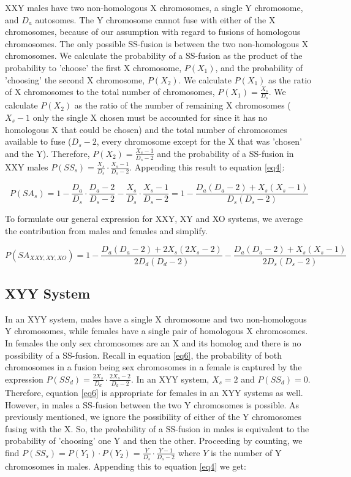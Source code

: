 \documentclass[12pt]{article}
\begin{document}
XXY males have two non-homologous X chromosomes, a single Y chromosome, and $D_a$ autosomes.
The Y chromosome cannot fuse with either of the X chromosomes, because of our assumption with regard to fusions of homologous chromosomes. 
The only possible SS-fusion is between the two non-homologous X chromosomes. 
We calculate the probability of a SS-fusion as the product of the probability to 'choose' the first X chromosome, $P(X_1)$, and the probability of 'choosing' the second X chromosome, $P(X_2)$. 
We calculate $P(X_1)$ as the ratio of X chromosomes to the total number of chromosomes, $P(X_1) = \frac{X_s}{D_s}$.
We calculate $P(X_2)$ as the ratio of the number of remaining X chromosomes ($X_s - 1$ only the single X chosen must be accounted for since it has no homologous X that could be chosen) and the total number of chromosomes available to fuse ($D_s - 2 $, every chromosome except for the X that was 'chosen' and the Y).  
Therefore, $P(X_2) = \frac{X_s - 1}{D_s - 2}$ and the probability of a SS-fusion in XXY males $P(SS_s) = \frac{X_s}{D_s} \cdot \frac{X_s - 1}{D_s - 2}$.
Appending this result to equation \ref{eq4}:

    \begin{equation} \label{eq7}
        P(SA_s) = 1 - \frac{D_a}{D_s} \cdot \frac{D_a - 2}{D_s - 2} - \frac{X_s}{D_s} \cdot \frac{X_s - 1}{D_s - 2} = 1 - \frac{D_a(D_a - 2) + X_s(X_s-1)}{D_s(D_s-2)}
    \end{equation}
    
To formulate our general expression for XXY, XY and XO systems, we average the contribution from males and females and simplify.

\begin{equation} \label{eq8}
P(SA_{XXY, XY, XO}) = 1 -\frac{D_a(D_a-2) + 2X_s(2X_s-2)}{2D_d(D_d-2)} - \frac{D_a(D_a - 2) + X_s(X_s-1)}{2D_s(D_s-2)}
\end{equation}

\subsection{XYY System}
In an XYY system, males have a single X chromosome and two non-homologous Y chromosomes, while females have a single pair of homologous X chromosomes.
In females the only sex chromosomes are an X and its homolog and there is no possibility of a SS-fusion.
Recall in equation \ref{eq6}, the probability of both chromosomes in a fusion being sex chromosomes in a female is captured by the expression $P(SS_d) = \frac{2X_s}{D_d} \cdot \frac{2X_s-2}{D_d-2}$. In an XYY system, $X_s=2$ and $P(SS_d) = 0$. 
Therefore, equation \ref{eq6} is appropriate for females in an XYY systems as well.
However, in males a SS-fusion between the two Y chromosomes is possible.
As previously mentioned, we ignore the possibility of either of the Y chromosomes fusing with the X.
So, the probability of a SS-fusion in males is equivalent to the probability of 'choosing' one Y and then the other. 
Proceeding by counting, we find $ P(SS_s) = P(Y_1) \cdot P(Y_2) = \frac{Y}{D_s} \cdot \frac{Y - 1}{D_s - 2}$ where $Y$ is the number of Y chromosomes in males.
Appending this to equation \ref{eq4} we get:
\end{document}

